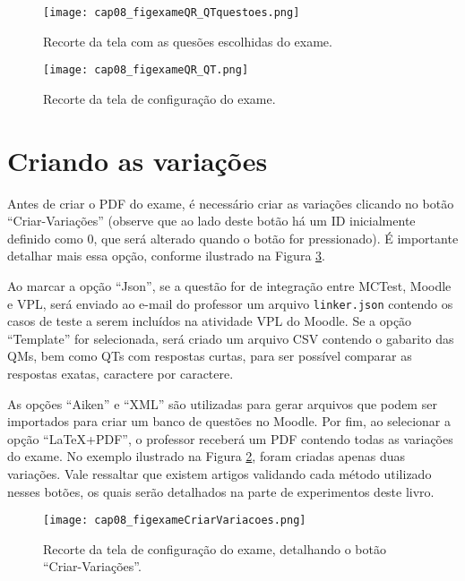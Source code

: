 \begin{figure}[!ht]
  \centering
  \texttt{[image: cap08\_figexameQR\_QTquestoes.png]}
   \caption{Recorte da tela com as quesões escolhidas do exame.}
\label{fig:cap08_figexameQR_QTquestoes}
\end{figure}

\begin{figure}[!ht]
  \centering
  \texttt{[image: cap08\_figexameQR\_QT.png]}
   \caption{Recorte da tela de configuração do exame.}
\label{fig:cap08_figexameQR_QT}
\end{figure}

\section{Criando as variações}

Antes de criar o PDF do exame, é necessário criar as variações clicando no botão ``Criar-Variações'' (observe que ao lado deste botão há um ID inicialmente definido como 0, que será alterado quando o botão for pressionado). É importante detalhar mais essa opção, conforme ilustrado na Figura \ref{fig:cap08_figexameCriarVariacoes}.

Ao marcar a opção ``Json'', se a questão for de integração entre MCTest, Moodle e VPL, será enviado ao e-mail do professor um arquivo \verb|linker.json| contendo os casos de teste a serem incluídos na atividade VPL do Moodle. Se a opção ``Template'' for selecionada, será criado um arquivo CSV contendo o gabarito das QMs, bem como QTs com respostas curtas, para ser possível comparar as respostas exatas, caractere por caractere.

As opções ``Aiken'' e ``XML'' são utilizadas para gerar arquivos que podem ser importados para criar um banco de questões no Moodle. Por fim, ao selecionar a opção ``LaTeX+PDF'', o professor receberá um PDF contendo todas as variações do exame. No exemplo ilustrado na Figura \ref{fig:cap08_figexameQR_QT}, foram criadas apenas duas variações. Vale ressaltar que existem artigos validando cada método utilizado nesses botões, os quais serão detalhados na parte de experimentos deste livro.

\begin{figure}[!ht]
  \centering
  \texttt{[image: cap08\_figexameCriarVariacoes.png]}
   \caption{Recorte da tela de configuração do exame, detalhando o botão ``Criar-Variações''.}
\label{fig:cap08_figexameCriarVariacoes}
\end{figure}

